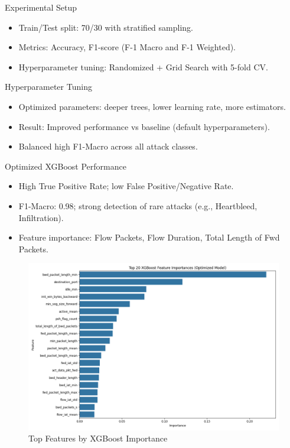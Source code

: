 \documentclass{beamer}
\begin{document}
\begin{frame}{Experimental Setup}
\begin{itemize}
    \item Train/Test split: 70/30 with stratified sampling.
    \item Metrics: Accuracy, F1-score (F-1 Macro and F-1 Weighted).
    \item Hyperparameter tuning: Randomized + Grid Search with 5-fold CV.
\end{itemize}
\end{frame}

\begin{frame}{Hyperparameter Tuning}
\begin{itemize}
    \item Optimized parameters: deeper trees, lower learning rate, more estimators.
    \item Result: Improved performance vs baseline (default hyperparameters).
    \item Balanced high F1-Macro across all attack classes.
\end{itemize}
\end{frame}

\begin{frame}{Optimized XGBoost Performance}
\begin{itemize}
    \item High True Positive Rate; low False Positive/Negative Rate.
    \item F1-Macro: 0.98; strong detection of rare attacks (e.g., Heartbleed, Infiltration).
    \item Feature importance: Flow Packets, Flow Duration, Total Length of Fwd Packets.
\end{itemize}
\begin{figure}
    \includegraphics[width=0.7\linewidth]{assets/figures/results/xgboost_feature_importance.png}
    \caption{Top Features by XGBoost Importance}
\end{figure}
\end{frame}
\end{document}
